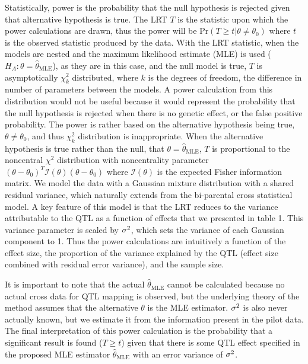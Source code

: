 Statistically, power is the probability that the null hypothesis is rejected given that alternative hypothesis is true. The LRT $T$ is the statistic upon which the power calculations are drawn, thus the power will be $\text{Pr}(T \ge t | \theta \neq \theta_{0})$ where $t$ is the observed statistic produced by the data. With the LRT statistic, when the models are nested and the maximum likelihood estimate (MLE) is used ($H_{A}: \theta = \widehat{\theta}_{\text{MLE}}$), as they are in this case, and the null model is true, $T$ is asymptotically $\chi^{2}_{k}$ distributed, where $k$ is the degrees of freedom, the difference in number of parameters between the models. A power calculation from this distribution would not be useful because it would represent the probability that the null hypothesis is rejected when there is no genetic effect, or the false positive probability. The power is rather based on the alternative hypothesis being true, $\theta \neq \theta_{0}$, and thus $\chi^{2}_{k}$ distribution is inappropriate. When the alternative hypothesis is true rather than the null, that $\theta = \widehat{\theta}_{\text{MLE}}$, $T$ is proportional to the noncentral $\chi^{2}$ distribution with noncentrality parameter $(\theta - \theta_{0})^{T}\mathcal{I}(\theta)(\theta - \theta_{0})$ where $\mathcal{I}(\theta)$ is the expected Fisher information matrix. We model the data with a Gaussian mixture distribution with a shared residual variance, which naturally extends from the bi-parental cross statistical model. A key feature of this model is that the LRT reduces to the variance attributable to the QTL as a function of effects that we presented in table 1. This variance parameter is scaled by $\sigma^{2}$, which sets the variance of each Gaussian component to 1. Thus the power calculations are intuitively a function of the effect size, the proportion of the variance explained by the QTL (effect size combined with residual error variance), and the sample size.

It is important to note that the actual $\widehat{\theta}_{\text{MLE}}$ cannot be calculated because no actual cross data for QTL mapping is observed, but the underlying theory of the method assumes that the alternative $\theta$ is the MLE estimator. $\sigma^{2}$ is also never actually known, but we estimate it from the information present in the pilot data. The final interpretation of this power calculation is the probability that a significant result is found ($T \ge t$) given that there is some QTL effect specified in the proposed MLE estimator $\widehat{\theta}_{\text{MLE}}$ with an error variance of $\sigma^{2}$.

